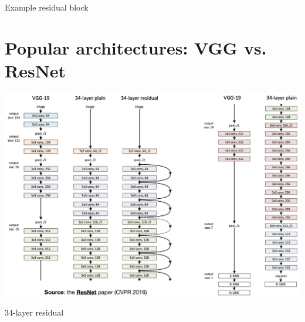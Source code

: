 \documentclass[10pt]{article}
\begin{document}
Example residual block

\section*{Popular architectures: VGG vs. ResNet}
\begin{center}
\includegraphics[max width=\textwidth]{2024_01_08_959e2db67a31f073f6d2g-21(1)}
\end{center}

34-layer residual
\end{document}
